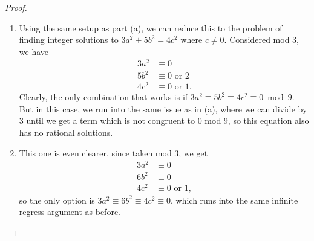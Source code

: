 \documentclass[12pt]{article}
\theoremstyle{definition}
\begin{document}
\begin{proof}
\begin{enumerate}[label=(\alph*)]
		      First, we consider when the RHS is congruent to 0 mod 9.
		      The only pairing of 0, 1, 4, and 7 whose sum is congruent to 0 mod 9 is $(0, 0)$, so we would have \begin{equation*}
			      a^2 \equiv b^2 \equiv 6c^2 \equiv 0 \bmod 9.
		      \end{equation*}
		      Since $(0, 0, 0)$ is not a solution, at least one of $a^2$ or $b^2$ must be nonzero, and thus we could divide by 6 on both sides repeatedly until we no longer had each term being congruent to 0 mod 9.
		      This reduces the problem down to the only remaining case: where the equation is congruent to 6 mod 9.
		      In this case however, we readily see that no pairing of 0, 1, 4, and 7 yields a sum congruent to 6 mod 9, so we conclude that there are no rational solutions to $x^2 + y^2 = 6$.
		\item Using the same setup as part (a), we can reduce this to the problem of finding integer solutions to $3a^2 + 5b^2 = 4c^2$ where $c \neq 0$.
		      Considered mod 3, we have \begin{align*}
			      3a^2 & \equiv 0                \\
			      5b^2 & \equiv 0 \text{ or } 2  \\
			      4c^2 & \equiv 0 \text{ or } 1.
		      \end{align*}
		      Clearly, the only combination that works is if $3a^2 \equiv 5b^2 \equiv 4c^2 \equiv 0 \bmod 9$.
		      But in this case, we run into the same issue as in (a), where we can divide by 3 until we get a term which is not congruent to $0$ mod 9, so this equation also has no rational solutions.
		\item This one is even clearer, since taken mod 3, we get \begin{align*}
			      3a^2 & \equiv 0                \\
			      6b^2 & \equiv 0                \\
			      4c^2 & \equiv 0 \text{ or } 1,
		      \end{align*}
		      so the only option is $3a^2 \equiv 6b^2 \equiv 4c^2 \equiv 0$, which runs into the same infinite regress argument as before.
	\end{enumerate}
\end{proof}
\end{document}
